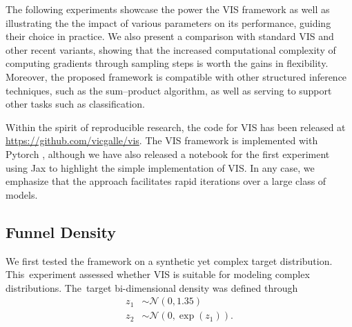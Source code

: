 
{The following experiments showcase the power the VIS framework as well as illustrating the the impact of various parameters on its performance, guiding their 
choice in practice. We 
also present a comparison with standard VIS
and other recent variants, showing that the increased computational complexity of computing
gradients through sampling steps is worth the gains in flexibility.
Moreover, the proposed framework is compatible with other structured inference techniques, such as the sum--product algorithm, as well as serving to support other tasks such as  classification}.

Within the spirit of reproducible research, 
the code for VIS has been released at %
\url{https://github.com/vicgalle/vis}. 
The VIS framework is implemented with Pytorch \cite{paszke2017automatic}, although we have also released a notebook for the first experiment using Jax to highlight the simple implementation of VIS.
In any case, we emphasize that the approach facilitates 
rapid iterations over a large class of models. 

\subsection{Funnel Density}

We first tested the framework on a synthetic yet complex target distribution. This~experiment assessed whether VIS is
suitable for modeling complex distributions. The~target bi-dimensional density was defined through
\begin{align*}
    z_1 &\sim \mathcal{N}(0, 1.35) \\
    z_2 &\sim \mathcal{N}(0, \exp(z_1)).
\end{align*}



